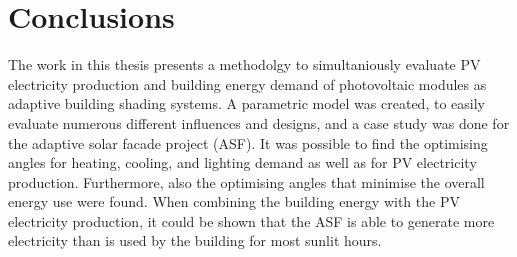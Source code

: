 \chapter{Conclusions}
\label{ch:conclusion}






The work in this thesis presents a methodolgy to simultaniously evaluate PV electricity production and building energy demand of photovoltaic modules as adaptive building shading systems. A parametric model was created, to easily evaluate numerous different influences and designs, and a case study was done for the adaptive solar facade project (ASF). It was possible to find the optimising angles for heating, cooling, and lighting demand as well as for PV electricity production. Furthermore, also the optimising angles that minimise the overall energy use were found. When combining the building energy with the PV electricity production, it could be shown that the ASF is able to generate more electricity than is used by the building for most sunlit hours. 

